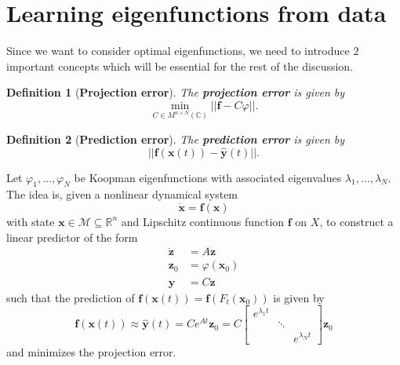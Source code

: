 \documentclass[]{article}
\newtheorem{definition}{Definition}
\begin{document}
\section{Learning eigenfunctions from data}
Since we want to consider optimal eigenfunctions, we need to introduce $2$ important concepts which will be essential for the rest of the discussion.
\begin{definition}[\textbf{Projection error}]
	The \textbf{projection error} is given by
	\begin{equation}
		\min_{C \in M^{n \times N}(\mathbb{C})} ||\textbf{f}-C\varphi||.
	\end{equation}
\end{definition}
\begin{definition}[\textbf{Prediction error}]
The \textbf{prediction error} is given by
\begin{equation}
	||\textbf{f}(\textbf{x}(t))-\hat{\textbf{y}}(t)||.
\end{equation}
\end{definition}
Let $\varphi_1,\dots,\varphi_N$ be Koopman eigenfunctions with associated eigenvalues $\lambda_1,\dots,\lambda_N$. The idea is, given a nonlinear dynamical system
\begin{equation}
	\dot{\textbf{x}}=\textbf{f}(\textbf{x})
\end{equation}
with state $\textbf{x} \in \mathcal{M} \subseteq \mathbb{R}^n$ and Lipschitz continuous function $\textbf{f}$  on $X$, to construct a linear predictor of the form
\begin{equation}
	\begin{split}
		\dot{\textbf{z}} & = A\textbf{z} \\
		\textbf{z}_0 & = \varphi(\textbf{x}_0) \\ 
		\hat{\textbf{y}} & = C \textbf{z}
	\end{split}
\end{equation}
such that the prediction of $\textbf{f}(\textbf{x}(t)) = \textbf{f}(F_t(\textbf{x}_0))$ is given by
\begin{equation}
	\textbf{f}(\textbf{x}(t)) \approx \hat{\textbf{y}}(t) = C e^{At} \textbf{z}_0 = C \begin{bmatrix}
		e^{\lambda_1 t} & & \\
		& \ddots & \\
		& & e^{\lambda_N t}
	\end{bmatrix} \textbf{z}_0
\end{equation}
and minimizes the projection error. \\
\end{document}
